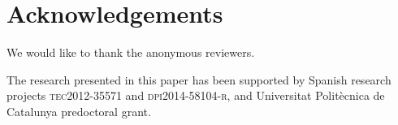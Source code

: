 \documentclass[
  preprint,
  review,
  twocolumn,
  5p,
  sort&compress,
]{elsarticle}
\begin{document}












\section*{Acknowledgements}

We would like to thank the anonymous reviewers.

The research presented in this paper has been supported by Spanish
research projects \textsc{tec2012-35571} and \textsc{dpi2014-58104-r},
and Universitat Polit\`{e}cnica de Catalunya predoctoral grant.




\end{document}
